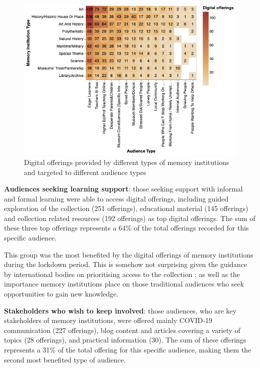 \documentclass{egpubl}
\begin{document}
\begin{figure}[h]
  \centering
  \includegraphics[width=\linewidth]{images/audiencesboth.png}
  \caption{\label{fig:MTypeAudiences}
           Digital offerings provided by different types of memory institutions and targeted to different audience types}
\end{figure}

\noindent \textbf{Audiences seeking learning support}: those seeking support with informal and formal learning were able to access digital offerings, including guided exploration of the collection (251 offerings), educational material (145 offerings) and collection related resources (192 offerings) as top digital offerings. The sum of these three top offerings represents a 64\% of the total offerings recorded for this specific audience. 

This group was the most benefited by the digital offerings of memory institutions during the lockdown period. This is somehow not surprising given the guidance by international bodies on prioritising access to the collection \cite{InternationalCouncilofMuseums2020}; as well as the importance memory institutions place on those traditional audiences who seek opportunities to gain new knowledge. 



\noindent \textbf{Stakeholders who wish to keep involved}: those audiences, who are key stakeholders of memory institutions, were offered mainly COVID-19 communication (227 offerings), blog content and articles covering a variety of topics (28 offerings), and practical information (30). The sum of these offerings represents a 31\% of the total offering for this specific audience, making them the second most benefited type of audience. 
\end{document}
